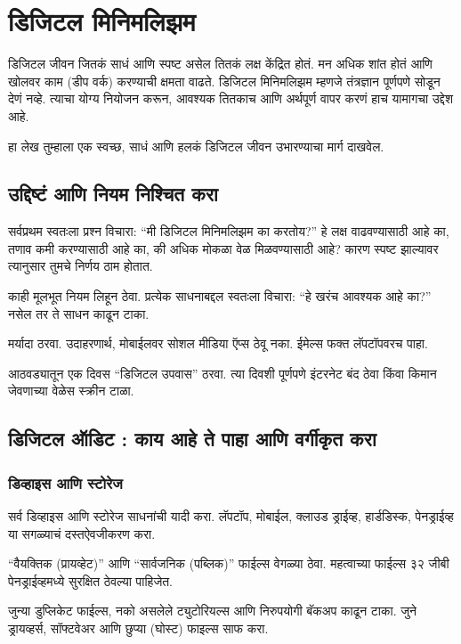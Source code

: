 \chapter{डिजिटल मिनिमलिझम}


डिजिटल जीवन जितकं साधं आणि स्पष्ट असेल तितकं लक्ष केंद्रित होतं. मन अधिक शांत होतं आणि खोलवर काम (डीप वर्क) करण्याची क्षमता वाढते. डिजिटल मिनिमलिझम म्हणजे तंत्रज्ञान पूर्णपणे सोडून देणं नव्हे. त्याचा योग्य नियोजन करून, आवश्यक तितकाच आणि अर्थपूर्ण वापर करणं हाच यामागचा उद्देश आहे.

हा लेख तुम्हाला एक स्वच्छ, साधं आणि हलकं डिजिटल जीवन उभारण्याचा मार्ग दाखवेल.

\section*{उद्दिष्टं आणि नियम निश्चित करा}

सर्वप्रथम स्वतःला प्रश्न विचारा: “मी डिजिटल मिनिमलिझम का करतोय?” हे लक्ष वाढवण्यासाठी आहे का, तणाव कमी करण्यासाठी आहे का, की अधिक मोकळा वेळ मिळवण्यासाठी आहे? कारण स्पष्ट झाल्यावर त्यानुसार तुमचे निर्णय ठाम होतात.

काही मूलभूत नियम लिहून ठेवा. प्रत्येक साधनाबद्दल स्वतःला विचारा: “हे खरंच आवश्यक आहे का?” नसेल तर ते साधन काढून टाका.

मर्यादा ठरवा. उदाहरणार्थ, मोबाईलवर सोशल मीडिया ऍप्स ठेवू नका. ईमेल्स फक्त लॅपटॉपवरच पाहा.

आठवड्यातून एक दिवस “डिजिटल उपवास” ठरवा. त्या दिवशी पूर्णपणे इंटरनेट बंद ठेवा किंवा किमान जेवणाच्या वेळेस स्क्रीन टाळा.



\section*{डिजिटल ऑडिट : काय आहे ते पाहा आणि वर्गीकृत करा}

\subsection*{डिव्हाइस आणि स्टोरेज}

सर्व डिव्हाइस आणि स्टोरेज साधनांची यादी करा. लॅपटॉप, मोबाईल, क्लाउड ड्राईव्ह, हार्डडिस्क, पेनड्राईव्ह या सगळ्याचं दस्तऐवजीकरण करा.

“वैयक्तिक (प्रायव्हेट)” आणि “सार्वजनिक (पब्लिक)” फाईल्स वेगळ्या ठेवा. महत्वाच्या फाईल्स ३२ जीबी पेनड्राईव्हमध्ये सुरक्षित ठेवल्या पाहिजेत.

जुन्या डुप्लिकेट फाईल्स, नको असलेले ट्युटोरियल्स आणि निरुपयोगी बॅकअप काढून टाका. जुने ड्रायव्हर्स, सॉफ्टवेअर आणि छुप्या (घोस्ट) फाइल्स साफ करा.

